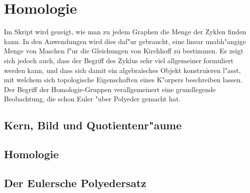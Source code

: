 %
%
%
\chapter{Homologie}
Im Skript wird gezeigt, wie man zu jedem Graphen die Menge der Zyklen
finden kann.
In den Anwendungen wird dies daf"ur gebraucht, eine linear unabh"angige
Menge von Maschen f"ur die Gleichungen von Kirchhoff zu bestimmen.
Es zeigt sich jedoch auch, dass der Begriff des Zyklus sehr viel
allgemeiner formuliert werden kann, und dass sich damit ein algebraisches
Objekt konstruieren l"asst, mit welchem sich topologische Eigenschaften
eines K"orpers beschreiben lassen.
Der Begriff der Homologie-Gruppen verallgemeinert eine grundlegende
Beobachtung, die schon Euler "uber Polyeder gemacht hat.

\section{Kern, Bild und Quotientenr"aume}
\section{Homologie}
\section{Der Eulersche Polyedersatz}





